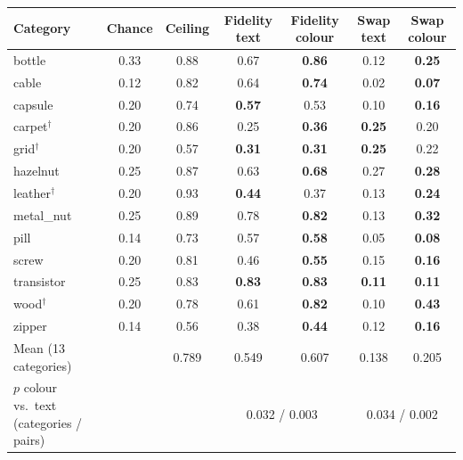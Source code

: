 \begin{tabular}{@{}l c c c c c c@{}}
\toprule
Category & Chance & Ceiling & Fidelity text & Fidelity colour & Swap text & Swap colour \\
\midrule
bottle & 0.33 & 0.88 & 0.67 & \textbf{0.86} & 0.12 & \textbf{0.25} \\
cable & 0.12 & 0.82 & 0.64 & \textbf{0.74} & 0.02 & \textbf{0.07} \\
capsule & 0.20 & 0.74 & \textbf{0.57} & 0.53 & 0.10 & \textbf{0.16} \\
carpet$^\dagger$ & 0.20 & 0.86 & 0.25 & \textbf{0.36} & \textbf{0.25} & 0.20 \\
grid$^\dagger$ & 0.20 & 0.57 & \textbf{0.31} & \textbf{0.31} & \textbf{0.25} & 0.22 \\
hazelnut & 0.25 & 0.87 & 0.63 & \textbf{0.68} & 0.27 & \textbf{0.28} \\
leather$^\dagger$ & 0.20 & 0.93 & \textbf{0.44} & 0.37 & 0.13 & \textbf{0.24} \\
metal\_nut & 0.25 & 0.89 & 0.78 & \textbf{0.82} & 0.13 & \textbf{0.32} \\
pill & 0.14 & 0.73 & 0.57 & \textbf{0.58} & 0.05 & \textbf{0.08} \\
screw & 0.20 & 0.81 & 0.46 & \textbf{0.55} & 0.15 & \textbf{0.16} \\
transistor & 0.25 & 0.83 & \textbf{0.83} & \textbf{0.83} & \textbf{0.11} & \textbf{0.11} \\
wood$^\dagger$ & 0.20 & 0.78 & 0.61 & \textbf{0.82} & 0.10 & \textbf{0.43} \\
zipper & 0.14 & 0.56 & 0.38 & \textbf{0.44} & 0.12 & \textbf{0.16} \\
\midrule
Mean (13 categories) & & 0.789 & 0.549 & 0.607 & 0.138 & 0.205 \\
$p$ colour vs.\ text (categories / pairs) & & & \multicolumn{2}{c}{0.032 / 0.003} & \multicolumn{2}{c}{0.034 / 0.002} \\
\bottomrule
\end{tabular}
